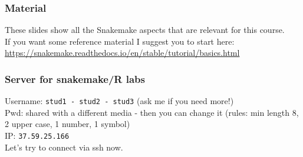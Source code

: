 \documentclass[xcolor=table]{beamer}
\begin{document}
\begin{frame}
\frametitle{Material}
These slides show all the Snakemake aspects that are relevant for this course. \\ If you want some reference material I suggest
you to start here: \url{https://snakemake.readthedocs.io/en/stable/tutorial/basics.html}
\end{frame}

\begin{frame}
\frametitle{Server for snakemake/R labs}

Username: \texttt{stud1 - stud2 - stud3} (ask me if you need more!) \\

Pwd: shared with a different media - then you can change it \small{(rules: min length 8, 2 upper case, 1 number, 1 symbol)} \\

IP: \texttt{37.59.25.166} \\

Let's try to connect via ssh now.
\end{frame}
\end{document}
